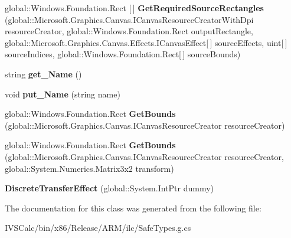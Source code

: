 \begin{DoxyCompactItemize}
\item 
\mbox{\label{class_microsoft_1_1_graphics_1_1_canvas_1_1_effects_1_1_discrete_transfer_effect_a73aa4cc05397c7720c48ef4454589b36}} 
global\+::\+Windows.\+Foundation.\+Rect \mbox{[}$\,$\mbox{]} {\bfseries Get\+Required\+Source\+Rectangles} (global\+::\+Microsoft.\+Graphics.\+Canvas.\+I\+Canvas\+Resource\+Creator\+With\+Dpi resource\+Creator, global\+::\+Windows.\+Foundation.\+Rect output\+Rectangle, global\+::\+Microsoft.\+Graphics.\+Canvas.\+Effects.\+I\+Canvas\+Effect\mbox{[}$\,$\mbox{]} source\+Effects, uint\mbox{[}$\,$\mbox{]} source\+Indices, global\+::\+Windows.\+Foundation.\+Rect\mbox{[}$\,$\mbox{]} source\+Bounds)
\item 
\mbox{\label{class_microsoft_1_1_graphics_1_1_canvas_1_1_effects_1_1_discrete_transfer_effect_afae65604f4eb2993b3d674e327a80095}} 
string {\bfseries get\+\_\+\+Name} ()
\item 
\mbox{\label{class_microsoft_1_1_graphics_1_1_canvas_1_1_effects_1_1_discrete_transfer_effect_a089b46dcf0c47b31005f64f6a738da3a}} 
void {\bfseries put\+\_\+\+Name} (string name)
\item 
\mbox{\label{class_microsoft_1_1_graphics_1_1_canvas_1_1_effects_1_1_discrete_transfer_effect_a29bc7df704cbb0abd4f3dfa7070a673a}} 
global\+::\+Windows.\+Foundation.\+Rect {\bfseries Get\+Bounds} (global\+::\+Microsoft.\+Graphics.\+Canvas.\+I\+Canvas\+Resource\+Creator resource\+Creator)
\item 
\mbox{\label{class_microsoft_1_1_graphics_1_1_canvas_1_1_effects_1_1_discrete_transfer_effect_a0a5ebcbbad09579e42e05a5c1a687212}} 
global\+::\+Windows.\+Foundation.\+Rect {\bfseries Get\+Bounds} (global\+::\+Microsoft.\+Graphics.\+Canvas.\+I\+Canvas\+Resource\+Creator resource\+Creator, global\+::\+System.\+Numerics.\+Matrix3x2 transform)
\item 
\mbox{\label{class_microsoft_1_1_graphics_1_1_canvas_1_1_effects_1_1_discrete_transfer_effect_a4a58f3e3c50931d7fdf1fd35c5af37e7}} 
{\bfseries Discrete\+Transfer\+Effect} (global\+::\+System.\+Int\+Ptr dummy)
\end{DoxyCompactItemize}


The documentation for this class was generated from the following file\+:\begin{DoxyCompactItemize}
\item 
I\+V\+S\+Calc/bin/x86/\+Release/\+A\+R\+M/ilc/Safe\+Types.\+g.\+cs\end{DoxyCompactItemize}
